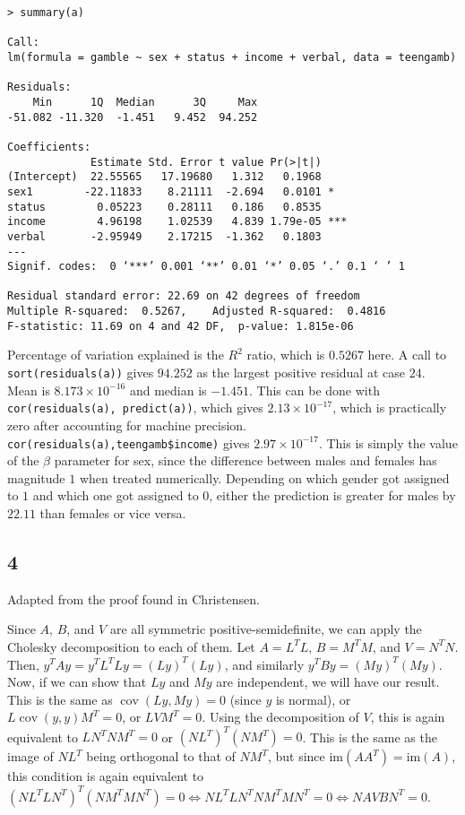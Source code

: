 \documentclass{article}
\DeclareMathOperator{\cov}{cov}
\begin{document}
\begin{verbatim}
> summary(a)

Call:
lm(formula = gamble ~ sex + status + income + verbal, data = teengamb)

Residuals:
    Min      1Q  Median      3Q     Max 
-51.082 -11.320  -1.451   9.452  94.252 

Coefficients:
             Estimate Std. Error t value Pr(>|t|)    
(Intercept)  22.55565   17.19680   1.312   0.1968    
sex1        -22.11833    8.21111  -2.694   0.0101 *  
status        0.05223    0.28111   0.186   0.8535    
income        4.96198    1.02539   4.839 1.79e-05 ***
verbal       -2.95949    2.17215  -1.362   0.1803    
---
Signif. codes:  0 ‘***’ 0.001 ‘**’ 0.01 ‘*’ 0.05 ‘.’ 0.1 ‘ ’ 1

Residual standard error: 22.69 on 42 degrees of freedom
Multiple R-squared:  0.5267,	Adjusted R-squared:  0.4816 
F-statistic: 11.69 on 4 and 42 DF,  p-value: 1.815e-06
\end{verbatim}
Percentage of variation explained is the $R^2$ ratio, which is $0.5267$ here.
A call to \verb|sort(residuals(a))| gives $94.252$ as the largest positive residual at case $24$.
Mean is $8.173\times10^{-16}$ and median is $-1.451$.
This can be done with \verb|cor(residuals(a), predict(a))|, which gives $2.13\times10^{-17}$, which is practically zero after accounting for machine precision.
\verb|cor(residuals(a),teengamb$income)| gives $2.97\times10^{-17}$.
This is simply the value of the $\beta$ parameter for sex, since the difference between males and females has magnitude $1$ when treated numerically. Depending on which gender got assigned to $1$ and which one got assigned to $0$, either the prediction is greater for males by $22.11$ than females or vice versa.
\subsection*{4}
Adapted from the proof found in Christensen.

Since $A$, $B$, and $V$ are all symmetric positive-semidefinite, we can apply the Cholesky decomposition to each of them. Let $A=L^TL$, $B=M^TM$, and $V=N^TN$. Then, $y^TAy=y^TL^TLy=(Ly)^T(Ly)$, and similarly $y^TBy=(My)^T(My)$. Now, if we can show that $Ly$ and $My$ are independent, we will have our result. This is the same as $\cov(Ly,My)=0$ (since $y$ is normal), or $L\cov(y,y)M^T=0$, or $LVM^T=0$. Using the decomposition of $V$, this is again equivalent to $LN^TNM^T=0$ or $(NL^T)^T(NM^T)=0$. This is the same as the image of $NL^T$ being orthogonal to that of $NM^T$, but since $\text{im}(AA^T)=\text{im}(A)$, this condition is again equivalent to $(NL^TLN^T)^T(NM^TMN^T)=0\iff NL^TLN^TNM^TMN^T=0\iff NAVBN^T=0$.
\end{document}
